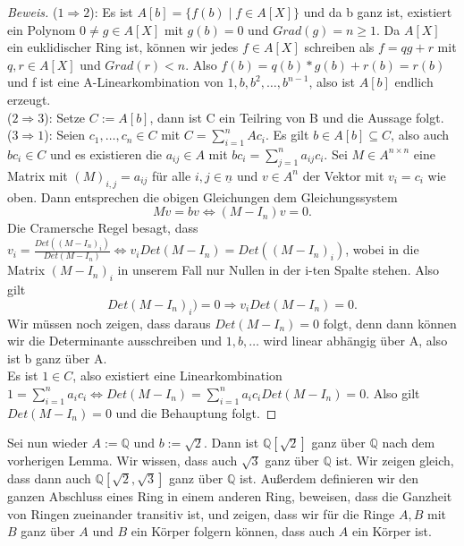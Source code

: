 \documentclass{article}
\begin{document}
	\begin{proof}[Beweis]
	(\(1 \Rightarrow 2\)): Es ist \(A[b] = \{f(b)\;|\;f\in A[X]\}\)
	und da b ganz ist, existiert ein Polynom \(0 \neq g \in A[X]\) mit \(g(b) 
	= 0\) und \(Grad(g) = n \geq 1\). Da \(A[X]\) ein euklidischer Ring ist, können
	wir jedes \(f \in A[X]\) schreiben als \(f = qg + r\) mit \(q,r \in A[X]\)
	und \(Grad(r) < n\). Also \(f(b) = q(b)*g(b) + r(b) = r(b)\) und f ist eine
	A-Linearkombination von \(1, b, b^2, \ldots, b^{n-1}\), also ist \(A[b]\)
	endlich erzeugt. \\
	(\(2 \Rightarrow 3\)): Setze \(C := A[b]\), dann ist C ein Teilring von B
	und die Aussage folgt. \\
	(\(3 \Rightarrow 1\)): Seien \(c_1, \ldots, c_n \in C\) mit \(C =
	\sum_{i=1}^n Ac_i\). Es gilt \(b \in A[b] \subseteq C\), also auch \(bc_i
	\in C\) und es existieren die \(a_{ij} \in A\) mit \(bc_i = \sum_{j=1}^n
	a_{ij}c_i\). Sei \(M \in A^{n\times n}\) eine Matrix mit \((M)_{i,j} =
	a_{ij}\) für alle \(i, j \in \underline{n}\) und \(v \in A^n\) der Vektor
	mit \(v_i = c_i\) wie oben. Dann entsprechen die obigen Gleichungen dem
	Gleichungssystem
	\begin{displaymath}Mv = bv \Leftrightarrow (M-I_n)v = 0.\end{displaymath}
	Die Cramersche Regel besagt, dass \(v_i = \frac{Det((M-I_n)_i)}{Det(M-I_n)}
	\Leftrightarrow v_iDet(M-I_n) = Det((M-I_n)_i)\), wobei in die Matrix
	\((M-I_n)_i \) in unserem Fall nur Nullen in der i-ten Spalte stehen. Also
	gilt \begin{displaymath} Det(M-I_n)_i) = 0 \Rightarrow v_iDet(M-I_n) = 0.
	\end{displaymath}
	Wir müssen noch zeigen, dass daraus \(Det(M-I_n) = 0\) folgt, denn dann 
	können wir die Determinante ausschreiben und \(1, b, \ldots\) wird linear
	abhängig über A, also ist b ganz über A. \\
	Es ist \(1 \in C\), also existiert eine Linearkombination \(1 =
	\sum_{i=1}^n a_ic_i \Leftrightarrow Det(M-I_n) = \sum_{i=1}^n
	a_ic_iDet(M-I_n) = 0\). Also gilt \(Det(M-I_n) = 0\) und die
	Behauptung folgt.
	\end{proof}
	
	Sei nun wieder \(A := \mathbb{Q}\) und \(b:=\sqrt{2}\). Dann ist \(\mathbb{Q}[\sqrt{2}]\) ganz über \(\mathbb{Q}\) nach dem vorherigen Lemma. Wir wissen,
	dass auch \(\sqrt{3}\) ganz über \(\mathbb{Q}\) ist. Wir zeigen gleich, dass
	dann auch \(\mathbb{Q}[\sqrt{2},\sqrt{3}]\) ganz über \(\mathbb{Q}\) ist.
	Außerdem definieren wir den ganzen Abschluss eines Ring in einem anderen Ring, beweisen, dass die Ganzheit von Ringen zueinander transitiv ist, und zeigen, dass wir für die Ringe \(A, B\) mit \(B\) ganz über \(A\) und \(B\) ein
	Körper folgern können, dass auch \(A\) ein Körper ist.
	
\end{document}
